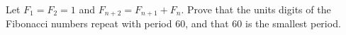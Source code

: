 Let $F_1=F_2=1$ and $F_{n+2}=F_{n+1}+F_n$. Prove that the units digits of the Fibonacci numbers repeat with period $60$, and that $60$ is the smallest period.
